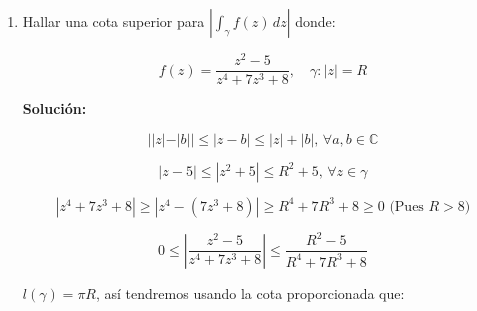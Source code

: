 \documentclass[a4paper,12pt]{article}
\begin{document}
\begin{enumerate}

Acotaremos $f(z)$ en $\gamma$:

\[
F(z) = f(x, ix) = x \cdot (1+i) \cdot x \cdot (\cos x + i \sin x) \cdot \sin (x + ix)
\]

Como nos piden una cota superior (no nos obligan a la menor cota superior) haremos lo siguiente:

\[
x \in [0, \pi/2], \, |f(z)| = \sqrt{2} x e^x |\sin(1+i)x|
\]

\[
|f(z)| \leq \left( \frac{\sqrt{2}}{2} \right) x e^x \left| e^{i(1+i)x} - e^{-i(1+i)x} \right|
\]

\[
|f(z)| \leq \left( \frac{\sqrt{2}}{2} \right) x e^x \left( |e^{i(1+i)x}| + |e^{-i(1+i)x}| \right)
\]

\[
|f(z)| \leq \left( \frac{\sqrt{2}}{2} \right) x e^x \left( e^x + e^x \right)
\]

\[
|f(z)| \leq \sqrt{2} x e^x \cosh x
\]

Las funciones $x, e^x, \cosh$, son crecientes en $[0, \pi/2]$, luego tenemos que:

\[
|f(z)| \leq \sqrt{2} \frac{\pi}{2} e^{\pi/2} \cosh \frac{\pi}{2}
\]

\[
|f(z)| \leq \sqrt{2} \frac{\pi}{2} \frac{(e^\pi + 1)}{2}, \, \forall z \in \gamma
\]

\[
\left| \int_{\gamma} f(z) \, dz \right| \leq \sqrt{2} \frac{\pi}{4} \left( e^\pi + 1 \right) \sqrt{2} \frac{\pi}{2}
\]

\[
\left| \int_{\gamma} f(z) \, dz \right| \leq \frac{\pi^2}{4} \left( e^\pi + 1 \right)
\]

\item Hallar una cota superior para $\left| \int_{\gamma} f(z) \, dz \right|$ donde:

\[
f(z) = \frac{z^2 - 5}{z^4 + 7z^3 + 8}, \quad \gamma: |z| = R
\]

\textbf{Solución:}

\[
| |z| - |b| | \leq |z - b| \leq |z| + |b|, \, \forall a, b \in \mathbb{C}
\]

\[
|z - 5| \leq |z^2 + 5| \leq R^2 + 5, \, \forall z \in \gamma
\]

\[
|z^4 + 7z^3 + 8| \geq |z^4 - (7z^3 + 8)| \geq R^4 + 7R^3 + 8 \geq 0 \text{ (Pues } R > 8)
\]


\[
0 \leq \left| \frac{z^2 - 5}{z^4 + 7z^3 + 8} \right| \leq \frac{R^2 - 5}{R^4 + 7R^3 + 8}
\]

$l(\gamma) = \pi R$, así tendremos usando la cota proporcionada que:


\end{enumerate}
\end{document}
